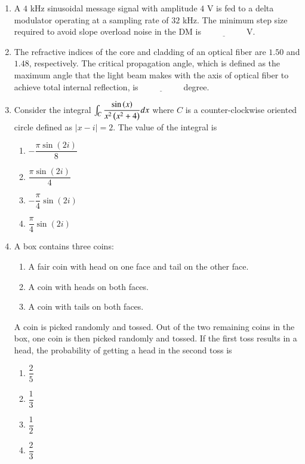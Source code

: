 \documentclass[journal,12pt,onecolumn]{IEEEtran}
\theoremstyle{remark}
\begin{document}
\begin{enumerate}
\hfill {}

\item A $4$ kHz sinusoidal message signal with amplitude $4$ V is fed to a delta modulator operating at a sampling rate of $32$ kHz.  
The minimum step size required to avoid slope overload noise in the DM   is $\underline{\hspace{2cm}}$ V.  

\hfill {}

\item The refractive indices of the core and cladding of an optical fiber are $1.50$ and $1.48$, respectively.  
The critical propagation angle, which is defined as the maximum angle that the light beam makes with the axis of optical fiber to achieve total internal reflection,  is $\underline{\hspace{2cm}}$ degree.  

\hfill {}

\item Consider the integral $\int_C \dfrac{\sin\left(x\right)}{x^2\left(x^2 + 4\right)} dx$ where $C$ is a counter-clockwise oriented circle defined as $|x - i| = 2$.  
The value of the integral is
\begin{multicols}{4}
\begin{enumerate}
\item $-\dfrac{\pi \sin(2i)}{8}$
\item $\dfrac{\pi \sin(2i)}{4}$
\item $-\dfrac{\pi}{4} \sin(2i)$
\item $\dfrac{\pi}{4} \sin(2i)$
\end{enumerate}
\end{multicols}
\hfill {}

\item A box contains three coins:  
\begin{enumerate}[label=\Roman*.]
    \item A fair coin with head on one face and tail on the other face.
    \item A coin with heads on both faces. 
    \item  A coin with tails on both faces.
\end{enumerate}
A coin is picked randomly and tossed. Out of the two remaining coins in the box, one coin is then picked randomly and tossed. If the first toss results in a head, the probability of getting a head in the second toss is
\begin{multicols}{4}
\begin{enumerate}
\item $\dfrac{2}{5}$
\item $\dfrac{1}{3}$
\item $\dfrac{1}{2}$
\item $\dfrac{2}{3}$
\end{enumerate}
\end{multicols}
\hfill {}


\end{enumerate}
\end{document}

